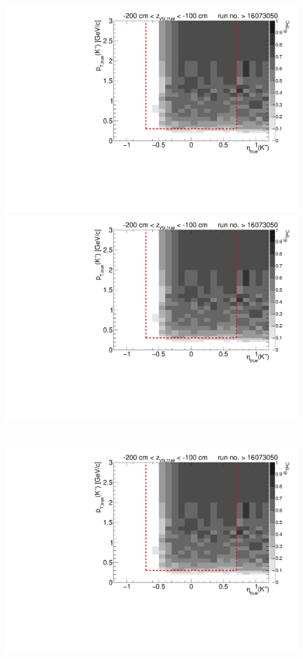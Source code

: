 \begin{figure}[hb]
{		\includegraphics[width=\linewidth,page=7]{graphics/eff/Eff2D_TPC_kaon_Plus_RunRange2.pdf}\\
		\includegraphics[width=\linewidth,page=9]{graphics/eff/Eff2D_TPC_kaon_Plus_RunRange2.pdf}
	}~
	\parbox{0.495\textwidth}{
		\centering
		\includegraphics[width=\linewidth,page=4]{graphics/eff/Eff2D_TPC_kaon_Plus_RunRange2.pdf}\\
}
\end{figure}
